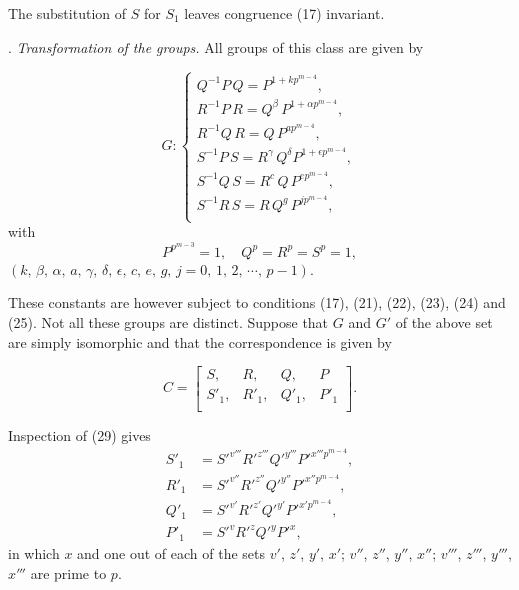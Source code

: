 \documentclass[oneside]{article}
\begin{document}
The substitution of $S$ for $S_1$ leaves congruence (17) invariant.

. \textit{Transformation of the groups.} All groups of this class are given by

\begin{equation}
G: \begin{cases}
Q^{-1} P\, Q = P^{1 + kp^{m-4}}, \\
R^{-1} P\, R = Q^\beta\, P^{1 + \alpha p^{m-4}}, \\
R^{-1} Q\, R = Q\, P^{ap^{m-4}}, \\
S^{-1} P\, S = R^\gamma\, Q^\delta P^{1 + \epsilon p^{m-4}}, \\
S^{-1} Q\, S = R^c\, Q\, P^{ep^{m-4}}, \\
S^{-1} R\, S = R\, Q^g\, P^{jp^{m-4}}, \\
\end{cases} %
\end{equation}
\noindent with
\begin{equation*}
P^{p^{m-3}} = 1, \quad Q^p = R^p = S^p = 1,
\end{equation*}
\noindent$(k,\, \beta,\, \alpha,\, a,\, \gamma,\, \delta,\, \epsilon,\, c,\,
e,\, g,\, j = 0,\, 1,\, 2,\, \cdots,\, p - 1)$.

These constants are however subject to conditions (17), (21), (22), (23),
(24) and (25). Not all these groups are distinct. Suppose that $G$ and
$G'$ of the above set are simply isomorphic and that the correspondence is
given by

\begin{equation*}
C = \left[ \begin{matrix}S,    & R,    & Q,    & P \\
                         S'_1, & R'_1, & Q'_1, & P'_1 \\ \end{matrix} \right].
\end{equation*}

Inspection of (29) gives
\begin{align*}
S'_1 &= S'^{v'''} R'^{z'''} Q'^{y'''} P'^{x'''p^{m-4}}, \\
R'_1 &= S'^{v''} R'^{z''} Q'^{y''} P'^{x''p^{m-4}}, \\
Q'_1 &= S'^{v'} R'^{z'} Q'^{y'} P'^{x'p^{m-4}}, \\
P'_1 &= S'^v R'^z Q'^y P'^x,
\end{align*}
\noindent in which $x$ and one out of each of the sets $v'$, $z'$, $y'$, $x'$; $v''$,
$z''$, $y''$, $x''$; $v'''$, $z'''$, $y'''$, $x'''$ are prime to $p$.
\end{document}
